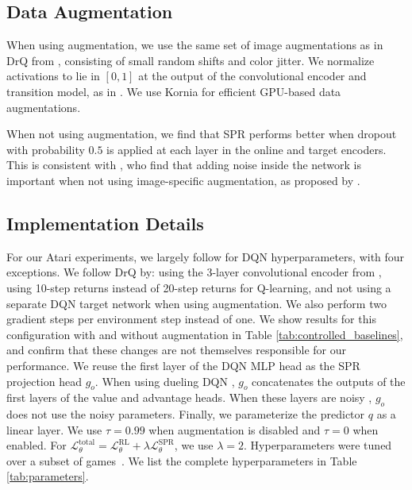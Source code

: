 \subsection{Data Augmentation}
When using augmentation,
we use the same set of image augmentations as in DrQ from \citet{drq}, consisting of small random shifts and color jitter. We normalize activations to lie in $[0, 1]$ at the output of the convolutional encoder and transition model, as in \cite{muzero}. We use Kornia \citep{riba2020kornia} for efficient GPU-based data augmentations.

When not using augmentation, we find that SPR performs better when dropout \citep{srivastava2014dropout} with probability $0.5$ is applied at each layer in the online and target encoders.  This is consistent with \citet{laine2016temporal, tarvainen2017mean}, who find that adding noise inside the network is important when not using image-specific augmentation, as proposed by \citet{bachman2014}.

\subsection{Implementation Details}
For our Atari experiments, we largely follow \cite{der} for DQN hyperparameters, with four exceptions. We follow DrQ  \citep{drq} by: using the 3-layer convolutional encoder from \cite{dqn}, using 10-step returns instead of 20-step returns for Q-learning, and not using a separate DQN target network when using augmentation.
We also perform two gradient steps per environment step instead of one. We show results for this configuration with and without augmentation in Table \ref{tab:controlled_baselines}, and confirm that these changes are not themselves responsible for our performance.  We reuse the first layer of the DQN MLP head as the SPR projection head $g_o$. When using dueling DQN \citep{wang2016dueling}, $g_o$ concatenates the outputs of the first layers of the value and advantage heads.  When these layers are noisy  \citep{fortunato2018noisy}, $g_o$ does not use the noisy parameters.  Finally, we parameterize the predictor $q$ as a linear layer.  We use $\tau=0.99$ when augmentation is disabled and $\tau=0$ when enabled. For $\mathcal{L}^{\text{total}}_\theta = \mathcal{L}^{\text{RL}}_\theta + \lambda \mathcal{L}^{\text{SPR}}_\theta$, we use $\lambda=2$. Hyperparameters were tuned over a subset of games~\citep[following][]{dqn, machado2018revisiting}. We list the complete hyperparameters in Table \ref{tab:parameters}.

